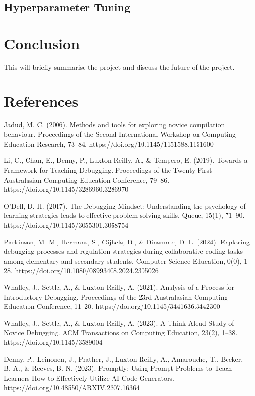 \documentclass[12pt]{extarticle}
\begin{document}
\subsection{Hyperparameter Tuning}


\newpage
\section{Conclusion}

This will briefly summarise the project and discuss the future of the project.

\newpage
\section{References}
\begin{thebibliography}{9}

Jadud, M. C. (2006). Methods and tools for exploring novice compilation behaviour. Proceedings of the Second International Workshop on Computing Education Research, 73–84. https://doi.org/10.1145/1151588.1151600

Li, C., Chan, E., Denny, P., Luxton-Reilly, A., \& Tempero, E. (2019). Towards a Framework for Teaching Debugging. Proceedings of the Twenty-First Australasian Computing Education Conference, 79–86. https://doi.org/10.1145/3286960.3286970

O’Dell, D. H. (2017). The Debugging Mindset: Understanding the psychology of learning strategies leads to effective problem-solving skills. Queue, 15(1), 71–90. https://doi.org/10.1145/3055301.3068754

Parkinson, M. M., Hermans, S., Gijbels, D., \& Dinsmore, D. L. (2024). Exploring debugging processes and regulation strategies during collaborative coding tasks among elementary and secondary students. Computer Science Education, 0(0), 1–28. https://doi.org/10.1080/08993408.2024.2305026

Whalley, J., Settle, A., \& Luxton-Reilly, A. (2021). Analysis of a Process for Introductory Debugging. Proceedings of the 23rd Australasian Computing Education Conference, 11–20. https://doi.org/10.1145/3441636.3442300

Whalley, J., Settle, A., \& Luxton-Reilly, A. (2023). A Think-Aloud Study of Novice Debugging. ACM Transactions on Computing Education, 23(2), 1–38. https://doi.org/10.1145/3589004

Denny, P., Leinonen, J., Prather, J., Luxton-Reilly, A., Amarouche, T., Becker, B. A., \& Reeves, B. N. (2023). Promptly: Using Prompt Problems to Teach Learners How to Effectively Utilize AI Code Generators. https://doi.org/10.48550/ARXIV.2307.16364


\end{thebibliography}
\end{document}
